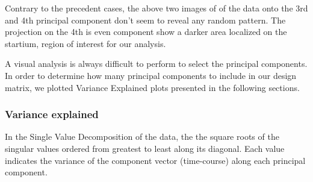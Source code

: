 \noindent
\par Contrary to the precedent cases, the above two images of of the data onto the 3rd 
and 4th principal component don't seem to reveal any random pattern. The projection on 
the 4th is even component show a darker area localized on the startium, region of interest
for our analysis.

\par A visual analysis is always difficult to perform to select the principal components. 
In order to determine how many principal components to include in our design matrix,
we plotted Variance Explained plots presented in the following sections.

\subsubsection{Variance explained} 
\noindent
\par In the Single Value Decomposition of the data, the the square roots of the 
singular values ordered from greatest to least along its diagonal. Each value 
indicates the variance of the component vector (time-course) along each principal component. 

